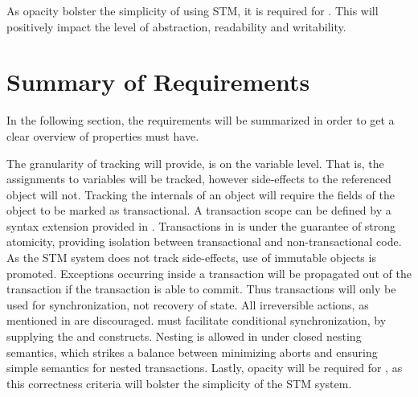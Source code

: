 As opacity bolster the simplicity of using \ac{STM}, it is required for \stmname. This will positively impact the level of abstraction, readability and writability.

\section{Summary of Requirements}\label{sec:sum_of_req}
In the following section, the requirements will be summarized in order to get a clear overview of properties \stmnamesp must have. 

The granularity of tracking \stmnamesp will provide, is on the variable level. That is, the assignments to variables will be tracked, however side-effects to the referenced object will not. Tracking the internals of an object will require the fields of the object to be marked as transactional. A transaction scope can be defined by a syntax extension provided in \stmname. Transactions in \stmnamesp is under the guarantee of strong atomicity, providing isolation between transactional and non-transactional code. As the \ac{STM} system does not track side-effects, use of immutable objects is promoted. Exceptions occurring inside a transaction will be propagated out of the transaction if the transaction is able to commit. Thus transactions will only be used for synchronization, not recovery of state. All irreversible actions, as mentioned in  are discouraged. \stmnamesp must facilitate conditional synchronization, by supplying the  and  constructs. Nesting is allowed in \stmnamesp under closed nesting semantics, which strikes a balance between minimizing aborts and ensuring simple semantics for nested transactions. Lastly, opacity will be required for \stmname, as this correctness criteria will bolster the simplicity of the \ac{STM} system.
\worksheetend
